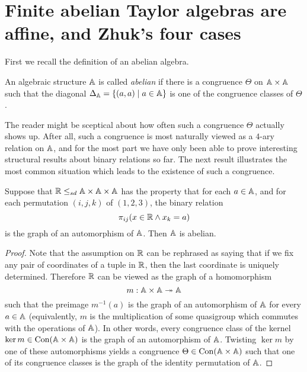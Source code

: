 \documentclass[letterpaper,11pt]{article}
\DeclareMathOperator{\Con}{Con}
\begin{document}



\section{Finite abelian Taylor algebras are affine, and Zhuk's four cases}

First we recall the definition of an abelian algebra.

\begin{defn} An algebraic structure $\mathbb{A}$ is called \emph{abelian} if there is a congruence $\Theta$ on $\mathbb{A}\times \mathbb{A}$ such that the diagonal $\Delta_{\mathbb{A}} = \{(a,a) \mid a \in \mathbb{A}\}$ is one of the congruence classes of $\Theta$.
\end{defn}

The reader might be sceptical about how often such a congruence $\Theta$ actually shows up. After all, such a congruence is most naturally viewed as a $4$-ary relation on $\mathbb{A}$, and for the most part we have only been able to prove interesting structural results about binary relations so far. The next result illustrates the most common situation which leads to the existence of such a congruence.

\begin{prop}\label{ternary-abelian} Suppose that $\mathbb{R} \le_{sd} \mathbb{A} \times \mathbb{A} \times \mathbb{A}$ has the property that for each $a \in \mathbb{A}$, and for each permutation $(i,j,k)$ of $(1,2,3)$, the binary relation
\[
\pi_{ij}(x\in\mathbb{R} \wedge x_k = a)
\]
is the graph of an automorphism of $\mathbb{A}$. Then $\mathbb{A}$ is abelian.
\end{prop}
\begin{proof} Note that the assumption on $\mathbb{R}$ can be rephrased as saying that if we fix any pair of coordinates of a tuple in $\mathbb{R}$, then the last coordinate is uniquely determined. Therefore $\mathbb{R}$ can be viewed as the graph of a homomorphism
\[
m: \mathbb{A}\times \mathbb{A} \twoheadrightarrow \mathbb{A}
\]
such that the preimage $m^{-1}(a)$ is the graph of an automorphism of $\mathbb{A}$ for every $a \in \mathbb{A}$ (equivalently, $m$ is the multiplication of some quasigroup which commutes with the operations of $\mathbb{A}$). In other words, every congruence class of the kernel $\ker m \in \Con(\bA \times \bA)$ is the graph of an automorphism of $\mathbb{A}$. Twisting $\ker m$ by one of these automorphisms yields a congruence $\Theta \in \Con(\bA\times \bA)$ such that one of its congruence classes is the graph of the identity permutation of $\mathbb{A}$.
\end{proof}
\end{document}
